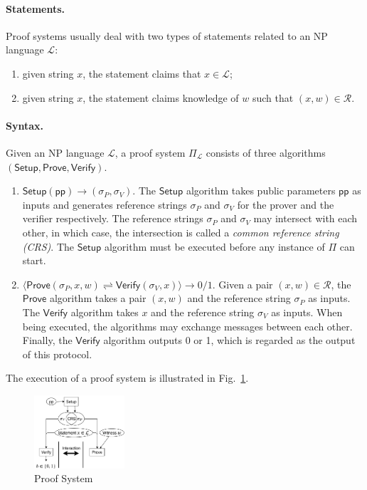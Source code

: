\documentclass[acmtog]{acmart}
\newcommand{\cL}{\mathcal{L}}
\newcommand{\cR}{\mathcal{R}}
\newcommand{\Setup}{\mathsf{Setup}}
\newcommand{\Prove}{\mathsf{Prove}}
\newcommand{\Verify}{\mathsf{Verify}}
\newcommand{\pp}{\mathsf{pp}}
\newcommand{\PiL}{\Pi_{\cL}}
\begin{document}
\paragraph{Statements.} Proof systems usually deal with two types of statements related to an NP language $\cL$:
\begin{enumerate}
	\item given string $x$, the statement claims that $x\in\cL$;
	\item given string $x$, the statement claims knowledge of $w$ such that $(x,w)\in\cR$.
\end{enumerate}

\paragraph{Syntax.}
Given an NP language $\cL$, a proof system $\PiL$ consists of three algorithms $(\Setup,\Prove,\Verify)$.
\begin{enumerate}
	\item $\Setup(\pp)\to(\sigma_P,\sigma_V)$. The $\Setup$ algorithm takes public parameters $\pp$ as inputs and generates reference strings $\sigma_P$ and $\sigma_V$ for the prover and the verifier respectively.
	The reference strings $\sigma_P$ and $\sigma_V$ may intersect with each other, in which case, the intersection is called a \emph{common reference string (CRS)}.
	The $\Setup$ algorithm must be executed before any instance of $\Pi$ can start.
	\item $\langle\Prove(\sigma_P, x, w)\rightleftharpoons\Verify(\sigma_V, x)\rangle\to 0/1$.
	Given a pair $(x,w)\in\cR$, the $\Prove$ algorithm takes a pair $(x,w)$ and the reference string $\sigma_P$ as inputs.
	The $\Verify$ algorithm takes $x$ and the reference string $\sigma_V$ as inputs.
	When being executed, the algorithms may exchange messages between each other.
	Finally, the $\Verify$ algorithm outputs 0 or 1, which is regarded as the output of this protocol.
\end{enumerate}
The execution of a proof system is illustrated in Fig.~\ref{fig:proof.system}.
\begin{figure}[ht!]
\includegraphics[width=0.3\textwidth]{images/proof-system.pdf}
\caption{Proof System}
\label{fig:proof.system}
\Description{}
\end{figure}
\end{document}
